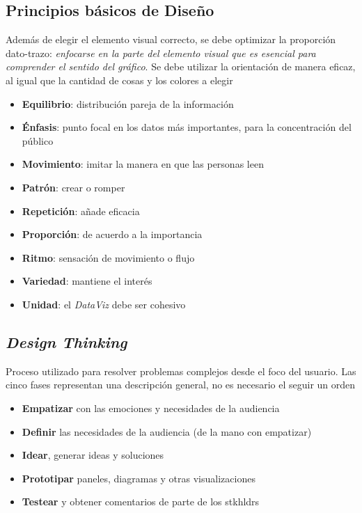 \subsection{Principios básicos de Diseño}
Además de elegir el elemento visual correcto, se debe optimizar la proporción dato-trazo: \textit{enfocarse en la parte del elemento visual que es esencial para comprender el sentido del gráfico}. Se debe utilizar la orientación de manera eficaz, al igual que la cantidad de cosas y los colores a elegir
\begin{itemize}
    \item {\textbf{Equilibrio}: distribución pareja de la información}
    \item {\textbf{Énfasis}: punto focal en los datos más importantes, para la concentración del público}
    \item {\textbf{Movimiento}: imitar la manera en que las personas leen}
    \item {\textbf{Patrón}: crear o romper}
    \item {\textbf{Repetición}: añade eficacia}
    \item {\textbf{Proporción}: de acuerdo a la importancia}
    \item {\textbf{Ritmo}: sensación de movimiento o flujo}
    \item {\textbf{Variedad}: mantiene el interés}
    \item {\textbf{Unidad}: el \textit{DataViz} debe ser cohesivo}
\end{itemize}

\subsection{\textit{Design Thinking}}
Proceso utilizado para resolver problemas complejos desde el foco del usuario. Las cinco fases representan una descripción general, no es necesario el seguir un orden
\begin{itemize}
    \item {\textbf{Empatizar} con las emociones y necesidades de la audiencia}
    \item {\textbf{Definir} las necesidades de la audiencia (de la mano con empatizar)}
    \item {\textbf{Idear}, generar ideas y soluciones} 
    \item {\textbf{Prototipar} paneles, diagramas y otras visualizaciones}
    \item {\textbf{Testear} y obtener comentarios de parte de los \gls{stkhldrs}}
\end{itemize}

\newpage